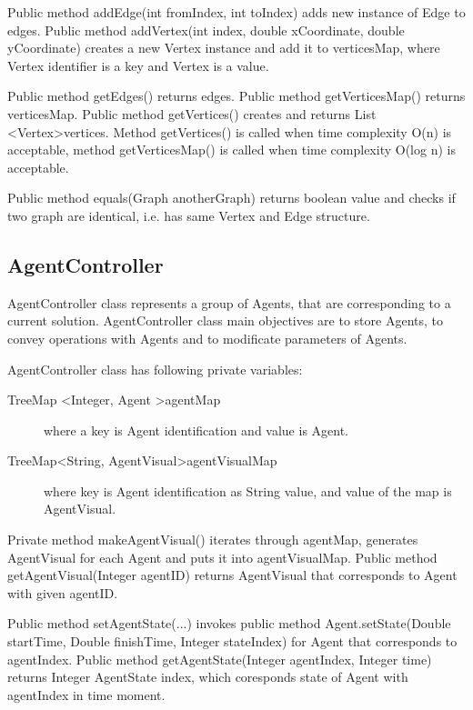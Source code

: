 \documentclass[thesis=B,english]{FITthesis}[2019/12/23]
\begin{document}
Public method addEdge(int fromIndex, int toIndex) adds new instance of Edge to edges.
Public method addVertex(int index, double xCoordinate, double yCoordinate) creates a new Vertex instance and add it to verticesMap, where Vertex identifier is a key and Vertex is a value.

Public method getEdges() returns edges. Public method getVerticesMap()
returns verticesMap. Public method getVertices() creates and returns List \textless Vertex\textgreater vertices. Method getVertices() is called when time complexity O(n) is acceptable, method getVerticesMap() is called when time complexity O(log n) is acceptable. 

Public method equals(Graph anotherGraph) returns boolean value and checks if two graph are identical, i.e. has same Vertex and Edge structure.

\subsection{AgentController}

AgentController class represents a group of Agents, that are corresponding to a current solution. AgentController class main objectives are to store Agents, to convey operations with Agents and to modificate parameters of Agents.

AgentController class has following private variables:
\begin{description}
\item[TreeMap \textless Integer, Agent \textgreater agentMap] where a key is Agent identification and value is Agent.
\item[TreeMap\textless String,  AgentVisual\textgreater  agentVisualMap] where key is Agent identification as String value, and value of the map is AgentVisual.
\end{description}


Private method makeAgentVisual() iterates through agentMap, generates AgentVisual for each Agent and puts it into agentVisualMap. Public method getAgentVisual(Integer agentID) returns AgentVisual that corresponds to Agent with given agentID.

Public method setAgentState(...) invokes public method Agent.setState(Double startTime, Double finishTime, Integer stateIndex) for Agent that corresponds to agentIndex. Public method getAgentState(Integer agentIndex, Integer time) returns Integer AgentState index, which coresponds state of Agent with agentIndex in time moment.
\end{document}
